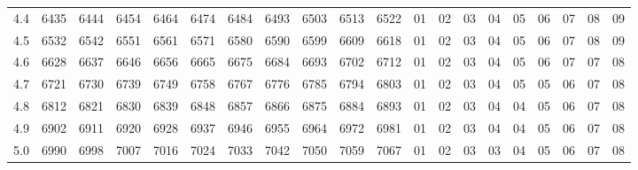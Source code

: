 \documentclass[12pt,UTF8,fontset=none]{ctexbook}
\begin{document}
\begin{appendix}
\begin{longtable}{|c| c c c c c | c c c c c| c c c c c c c c c|}
\scriptsize 4.4 & \scriptsize 6435 & \scriptsize 6444 & \scriptsize 6454 & \scriptsize 6464 & \scriptsize 6474 & \scriptsize 6484 & \scriptsize 6493 & \scriptsize 6503 & \scriptsize 6513 & \scriptsize 6522 & \scriptsize 01 & \scriptsize 02 & \scriptsize 03 & \scriptsize 04 & \scriptsize 05 & \scriptsize 06 & \scriptsize 07 & \scriptsize 08 & \scriptsize 09 \\
\scriptsize 4.5 & \scriptsize 6532 & \scriptsize 6542 & \scriptsize 6551 & \scriptsize 6561 & \scriptsize 6571 & \scriptsize 6580 & \scriptsize 6590 & \scriptsize 6599 & \scriptsize 6609 & \scriptsize 6618 & \scriptsize 01 & \scriptsize 02 & \scriptsize 03 & \scriptsize 04 & \scriptsize 05 & \scriptsize 06 & \scriptsize 07 & \scriptsize 08 & \scriptsize 09 \\
\scriptsize 4.6 & \scriptsize 6628 & \scriptsize 6637 & \scriptsize 6646 & \scriptsize 6656 & \scriptsize 6665 & \scriptsize 6675 & \scriptsize 6684 & \scriptsize 6693 & \scriptsize 6702 & \scriptsize 6712 & \scriptsize 01 & \scriptsize 02 & \scriptsize 03 & \scriptsize 04 & \scriptsize 05 & \scriptsize 06 & \scriptsize 07 & \scriptsize 07 & \scriptsize 08 \\
\scriptsize 4.7 & \scriptsize 6721 & \scriptsize 6730 & \scriptsize 6739 & \scriptsize 6749 & \scriptsize 6758 & \scriptsize 6767 & \scriptsize 6776 & \scriptsize 6785 & \scriptsize 6794 & \scriptsize 6803 & \scriptsize 01 & \scriptsize 02 & \scriptsize 03 & \scriptsize 04 & \scriptsize 05 & \scriptsize 05 & \scriptsize 06 & \scriptsize 07 & \scriptsize 08 \\
\scriptsize 4.8 & \scriptsize 6812 & \scriptsize 6821 & \scriptsize 6830 & \scriptsize 6839 & \scriptsize 6848 & \scriptsize 6857 & \scriptsize 6866 & \scriptsize 6875 & \scriptsize 6884 & \scriptsize 6893 & \scriptsize 01 & \scriptsize 02 & \scriptsize 03 & \scriptsize 04 & \scriptsize 04 & \scriptsize 05 & \scriptsize 06 & \scriptsize 07 & \scriptsize 08 \\
\scriptsize 4.9 & \scriptsize 6902 & \scriptsize 6911 & \scriptsize 6920 & \scriptsize 6928 & \scriptsize 6937 & \scriptsize 6946 & \scriptsize 6955 & \scriptsize 6964 & \scriptsize 6972 & \scriptsize 6981 & \scriptsize 01 & \scriptsize 02 & \scriptsize 03 & \scriptsize 04 & \scriptsize 04 & \scriptsize 05 & \scriptsize 06 & \scriptsize 07 & \scriptsize 08 \\
\scriptsize 5.0 & \scriptsize 6990 & \scriptsize 6998 & \scriptsize 7007 & \scriptsize 7016 & \scriptsize 7024 & \scriptsize 7033 & \scriptsize 7042 & \scriptsize 7050 & \scriptsize 7059 & \scriptsize 7067 & \scriptsize 01 & \scriptsize 02 & \scriptsize 03 & \scriptsize 03 & \scriptsize 04 & \scriptsize 05 & \scriptsize 06 & \scriptsize 07 & \scriptsize 08 \\

\end{longtable}
\end{appendix}
\end{document}
